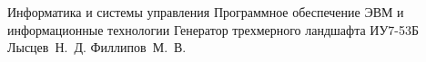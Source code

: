 \documentclass{bmstu}
\begin{document}
\makecourseworktitle
{Информатика и системы управления}
{Программное обеспечение ЭВМ и информационные технологии}
{Генератор трехмерного ландшафта}
{ИУ7-53Б}
{Лысцев~Н.~Д.}
{Филлипов~М.~В.}
{}
{}

\maketableofcontents

%
%







\makebibliography

%
\end{document}
